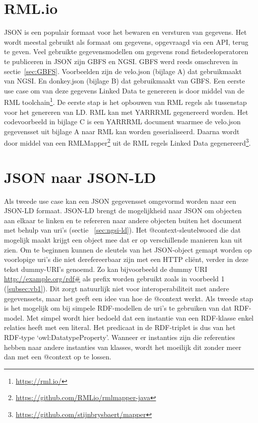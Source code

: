 \section{RML.io}
\label{sec:rml}
JSON is een populair formaat voor het bewaren en versturen van gegevens. Het wordt meestal gebruikt als formaat om gegevens, opgevraagd via een API, terug te geven. Veel gebruikte gegevensmodellen om gegevens rond fietsdeeloperatoren te publiceren in JSON zijn GBFS en NGSI. GBFS werd reeds omschreven in sectie~\ref{sec:GBFS}. Voorbeelden zijn de velo.json (bijlage A) dat gebruikmaakt van NGSI. En donkey.json (bijlage B) dat gebruikmaakt van GBFS. 
Een eerste use case om van deze gegevens Linked Data te genereren is door middel van de RML toolchain\footnote{\url{https://rml.io/}}. De eerste stap is het opbouwen van RML regels als tussenstap voor het genereren van LD. RML kan met YARRRML gegenereerd worden. Het codevoorbeeld in bijlage C is een YARRRML document waarmee de velo.json gegevensset uit bijlage A naar RML kan worden geserialiseerd.
Daarna wordt door middel van een RMLMapper\footnote{\url{https://github.com/RMLio/rmlmapper-java}} uit de RML regels Linked Data gegenereerd\footnote{\url{https://github.com/stijnbrysbaert/mapper}}.

\section{JSON naar JSON-LD}
\label{sec:json2jsonld}
Als tweede use case kan een JSON gegevensset omgevormd worden naar een JSON-LD formaat. JSON-LD brengt de mogelijkheid naar JSON om objecten aan elkaar te linken en te refereren naar andere objecten buiten het document met behulp van uri's (sectie ~\ref{sec:ngsi-ld}).
Het @context-sleutelwoord die dat mogelijk maakt krijgt een object mee dat er op verschillende manieren kan uit zien. Om te beginnen kunnen de sleutels van het JSON-object gemapt worden op voorlopige uri's die niet derefereerbaar zijn met een HTTP cliënt, verder in deze tekst dummy-URI's genoemd. Zo kan bijvoorbeeld de dummy URI \url{http://example.org/rdf#} als prefix worden gebruikt zoals in voorbeeld 1 (\ref{subsec:vb1}). Dit zorgt natuurlijk niet voor interoperabiliteit met andere gegevenssets, maar het geeft een idee van hoe de @context werkt.
Als tweede stap is het mogelijk om bij simpele RDF-modellen de uri's te gebruiken van dat RDF-model. Met simpel wordt hier bedoeld dat een instantie van een RDF-klasse enkel relaties heeft met een literal. Het predicaat in de RDF-triplet is dus van het RDF-type `owl:DatatypeProperty'. Wanneer er instanties zijn die referenties hebben naar andere instanties van klasses, wordt het moeilijk dit zonder meer dan met een @context op te lossen.

